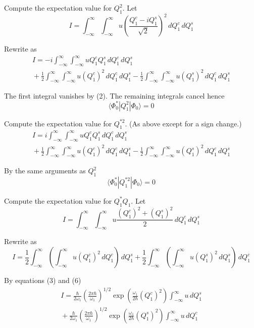 \documentclass[12pt]{article}
\begin{document}
Compute the expectation value for $Q_1^2$.
Let
\begin{equation*}
I=\int_{-\infty}^\infty\int_{-\infty}^\infty
u\left(\frac{Q_1^c-iQ_1^s}{\sqrt2}\right)^2\,dQ_1^c\,dQ_1^s
\end{equation*}

Rewrite as
\begin{multline*}
I=-i\int_{-\infty}^\infty\int_{-\infty}^\infty
uQ_1^cQ_1^s\,dQ_1^c\,dQ_1^s
\\
{}+\frac{1}{2}
\int_{-\infty}^\infty\int_{-\infty}^\infty
u(Q_1^c)^2\,dQ_1^c\,dQ_1^s
-\frac{1}{2}
\int_{-\infty}^\infty\int_{-\infty}^\infty
u(Q_1^s)^2\,dQ_1^c\,dQ_1^s
\end{multline*}

The first integral vanishes by (2).
The remaining integrals cancel hence
\begin{equation*}
\langle\Phi_0^*|Q_1^2|\Phi_0\rangle=0
\end{equation*}

Compute the expectation value for $Q_1^{*2}$.
(As above except for a sign change.)
\begin{multline*}
I=i\int_{-\infty}^\infty\int_{-\infty}^\infty
uQ_1^cQ_1^s\,dQ_1^c\,dQ_1^s
\\
{}+\frac{1}{2}
\int_{-\infty}^\infty\int_{-\infty}^\infty
u(Q_1^c)^2\,dQ_1^c\,dQ_1^s
-\frac{1}{2}
\int_{-\infty}^\infty\int_{-\infty}^\infty
u(Q_1^s)^2\,dQ_1^c\,dQ_1^s
\end{multline*}

By the same arguments as $Q_1^2$
\begin{equation*}
\langle\Phi_0^*|Q_1^{*2}|\Phi_0\rangle=0
\end{equation*}

Compute the expectation value for $Q_1^*Q_1$.
Let
\begin{equation*}
I=\int_{-\infty}^\infty\int_{-\infty}^\infty
u\frac{(Q_1^c)^2+(Q_1^s)^2}{2}\,dQ_1^c\,dQ_1^s
\end{equation*}

Rewrite as
\begin{equation*}
I=\frac{1}{2}\int_{-\infty}^\infty\left(\int_{-\infty}^\infty u(Q_1^c)^2\,dQ_1^c\right)\,dQ_1^s
+\frac{1}{2}\int_{-\infty}^\infty\left(\int_{-\infty}^\infty u(Q_1^s)^2\,dQ_1^s\right)\,dQ_1^c
\end{equation*}

By equations (3) and (6)
\begin{multline*}
I=
\frac{\hbar}{2\omega_1}\left(\frac{2\pi\hbar}{\omega_1}\right)^{1/2}
\exp\left(\frac{\omega_1}{2\hbar}(Q_1^c)^2\right)
\int_{-\infty}^\infty u\,dQ_1^s
\\
{}+\frac{\hbar}{2\omega_1}\left(\frac{2\pi\hbar}{\omega_1}\right)^{1/2}
\exp\left(\frac{\omega_1}{2\hbar}(Q_1^s)^2\right)
\int_{-\infty}^\infty u\,dQ_1^c
\end{multline*}
\end{document}

